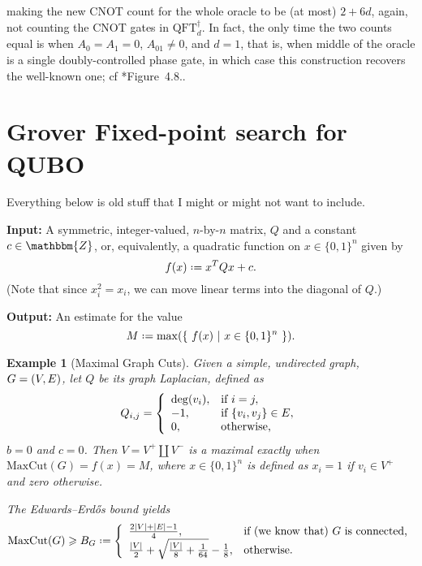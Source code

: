 \documentclass[reqno,oneside,12pt]{amsart}  %
\numberwithin{equation}{section}                %
\let\originalleft\left
\let\originalright\right
\renewcommand{\left}{\mathopen{}\mathclose\bgroup\originalleft}
\renewcommand{\right}{\aftergroup\egroup\originalright}
\def\({\mathopen{}\left(}
\def\){\right)\mathclose{}}
\newcommand*{\eqdef}{\mathrel{\vcenter{\baselineskip0.5ex \lineskiplimit0pt\hbox{.}\hbox{.}}}=}
\newtheorem{example}[theorem]{Example}
\def\Z{\mathbbm{Z}}
\def\QFT{\mathrm{QFT}}
\begin{document}
making the new CNOT count for the whole oracle to be (at most) $2 + 6d$, again, not counting the CNOT gates in $\QFT_d^\dagger$. In fact, the only time the two counts equal is when $A_0 = A_1 = 0$, $A_{01} \neq 0$, and $d = 1$, that is, when middle of the oracle is a single doubly-controlled phase gate, in which case this construction recovers the well-known one; cf \cite{nielsen_quantum_2010}*{Figure~4.8.}. 


\bigskip

\section{Grover Fixed-point search for QUBO}
\label{sec:grover_for_qubo}

\newpage

{\color{red} Everything below is old stuff that I might or might not want to include.}

\noindent\textbf{Input:} A symmetric, integer-valued, $n$-by-$n$ matrix, $Q$ and a constant $c \in \Z$, or, equivalently, a quadratic function on $x \in \{ 0, 1 \}^n$ given by
\begin{equation}
   f (x) \eqdef x^T Q x + c. \label{eq:QUBO}
\end{equation}
(Note that since $x_i^2 = x_i$, we can move linear terms into the diagonal of $Q$.)

\smallskip

\noindent\textbf{Output:} An estimate for the value
\begin{equation}
   M \eqdef \max \( \left\{ \ f (x) \ \middle| \ x \in \{ 0, 1 \}^n \ \right\} \).
\end{equation}

\medskip

\begin{example}[Maximal Graph Cuts]
   Given a simple, undirected graph, $G = \( V, E \)$, let $Q$ be its graph Laplacian, defined as
   \begin{equation}
      Q_{i, j} = \left\{ \begin{array}{ll} \deg \( v_i \), & \mbox{if } i = j, \\ - 1, & \mbox{if } \{ v_i, v_j \} \in E, \\ 0, & \mbox{otherwise,} \end{array} \right.
   \end{equation}
   $b = 0$ and $c = 0$. Then $V = V^+ \coprod V^-$ is a maximal exactly when $\mathrm{MaxCut} (G) = f(x) = M$, where $x \in \{ 0, 1 \}^n$ is defined as $x_i = 1$ if $v_i \in V^+$ and zero otherwise.

   The Edwards--Erd\H{o}s bound yields
   \begin{equation}
      \mathrm{MaxCut} (G) \geqslant B_G \eqdef \left\{ \begin{array}{ll} \frac{2 |V| + |E| - 1}{4}, & \mbox{if (we know that) $G$ is connected,} \\ \frac{|V|}{2} + \sqrt{\tfrac{|V|}{8} + \tfrac{1}{64}} - \frac{1}{8}, & \mbox{otherwise.} \end{array} \right.
   \end{equation}
\end{example}
\end{document}
